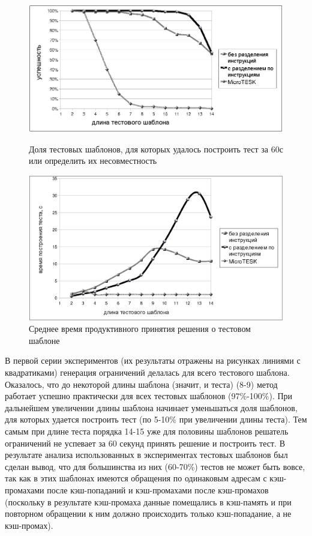 \documentclass[14pt]{extreport}
\begin{document}
\begin{figure}[p] \center
\parbox[t]{\textwidth}{
  \includegraphics[width=\textwidth]{4.analysis/success_exprmnt}%
\caption{Доля тестовых шаблонов, для которых удалось построить тест за 60с или определить их несовместность}\label{fig:success_experiment}
}

\vspace{1.5cm}

\parbox[t]{\textwidth}{
  \includegraphics[width=\textwidth]{4.analysis/time_exprmnt}
  \caption{Среднее время продуктивного принятия решения о тестовом шаблоне}\label{fig:time_experiment}
}
\end{figure}

В первой серии экспериментов (их результаты отражены на рисунках линиями с квадратиками) генерация ограничений делалась для всего тестового шаблона. Оказалось, что до некоторой длины шаблона (значит, и теста) (8-9) метод работает успешно практически для всех тестовых шаблонов (97\%-100\%). При дальнейшем увеличении длины шаблона начинает уменьшаться доля шаблонов, для которых удается построить тест (по 5-10\% при увеличении длины теста). Тем самым при длине теста порядка 14-15 уже для половины шаблонов решатель ограничений не успевает за 60 секунд принять решение и построить тест. В результате анализа использованных в экспериментах тестовых шаблонов был сделан вывод, что для большинства из них (60-70\%) тестов не может быть вовсе, так как в этих шаблонах имеются обращения по одинаковым адресам с кэш-промахами после кэш-попаданий и кэш-промахами после кэш-промахов (поскольку в результате кэш-промаха данные помещались в кэш-память и при повторном обращении к ним должно происходить только кэш-попадание, а не кэш-промах).
\end{document}
